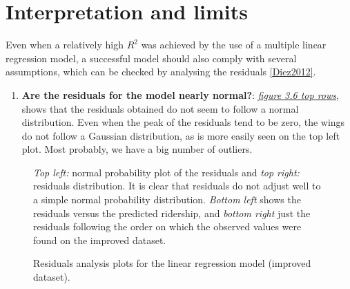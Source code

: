 \documentclass[a4paper,12pt,english]{sphinxmanual}
\begin{document}
\section{Interpretation and limits}
\label{section2:interpretation-and-limits}
Even when a relatively high \(R^2\) was achieved by the use of a multiple
linear regression model, a successful model should also comply with several
assumptions, which can be checked by analysing the residuals {\hyperref[overview:diez2012]{{[}Diez2012{]}}}.
\begin{enumerate}
\item {} 
\textbf{Are the residuals for the model nearly normal?}:
{\hyperref[section2:figure36]{\emph{figure 3.6 top rows}}}, shows that the residuals obtained do
not seem to follow a normal distribution. Even when the peak of the residuals
tend to be zero, the wings do not follow a Gaussian distribution, as is more
easily seen on the top left plot. Most probably, we have a big number of
outliers.

\end{enumerate}
\begin{figure}[htbp]
\centering
\capstart

\caption{Residuals analysis plots for the linear regression model (improved dataset).}{\small 
\emph{Top left:} normal probability plot of the residuals and \emph{top right:} residuals
distribution. It is clear that residuals do not adjust well to a simple normal
probability distribution. \emph{Bottom left} shows the residuals versus the
predicted ridership, and \emph{bottom right} just the residuals following the order
on which the observed values were found on the improved dataset.
}\label{section2:figure36}\end{figure}
\end{document}
